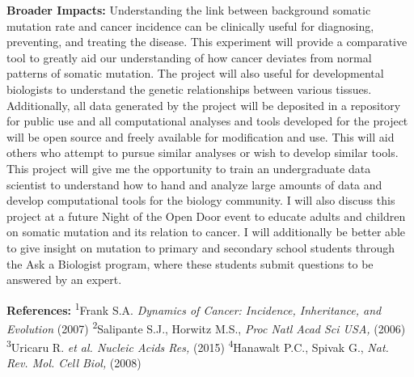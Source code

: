\documentclass[12pt]{article}
\begin{document}
\textbf{Broader Impacts:}
Understanding the link between background somatic mutation rate and cancer incidence can be clinically useful for diagnosing, preventing, and treating the disease.
This experiment will provide a comparative tool to greatly aid our understanding of how cancer deviates from normal patterns of somatic mutation.
The project will also useful for developmental biologists to understand the genetic relationships between various tissues.
Additionally, all data generated by the project will be deposited in a repository for public use and all computational analyses and tools developed for the project will be open source and freely available for modification and use.
This will aid others who attempt to pursue similar analyses or wish to develop similar tools.
This project will give me the opportunity to train an undergraduate data scientist to understand how to hand and analyze large amounts of data and develop computational tools for the biology community.
I will also discuss this project at a future Night of the Open Door event to educate adults and children on somatic mutation and its relation to cancer.
I will additionally be better able to give insight on mutation to primary and secondary school students through the Ask a Biologist program, where these students submit questions to be answered by an expert.

\begin{footnotesize}
\textbf{References:}
\textsuperscript{1}Frank S.A. \textit{Dynamics of Cancer: Incidence, Inheritance, and Evolution} (2007)
\textsuperscript{2}Salipante S.J., Horwitz M.S., \textit{Proc Natl Acad Sci USA,} (2006)
\textsuperscript{3}Uricaru R. \textit{et al. Nucleic Acids Res,} (2015)
\textsuperscript{4}Hanawalt P.C., Spivak G., \textit{Nat. Rev. Mol. Cell Biol,} (2008)

\end{footnotesize}
\end{document}
